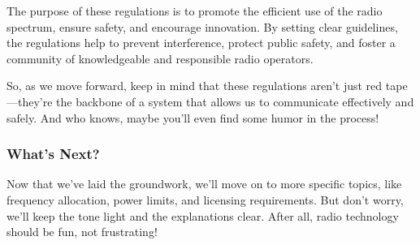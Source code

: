 The purpose of these regulations is to promote the efficient use of the radio spectrum, ensure safety, and encourage innovation. By setting clear guidelines, the regulations help to prevent interference, protect public safety, and foster a community of knowledgeable and responsible radio operators.

So, as we move forward, keep in mind that these regulations aren't just red tape—they're the backbone of a system that allows us to communicate effectively and safely. And who knows, maybe you'll even find some humor in the process!

\subsubsection*{What's Next?}

Now that we've laid the groundwork, we'll move on to more specific topics, like frequency allocation, power limits, and licensing requirements. But don't worry, we'll keep the tone light and the explanations clear. After all, radio technology should be fun, not frustrating!

